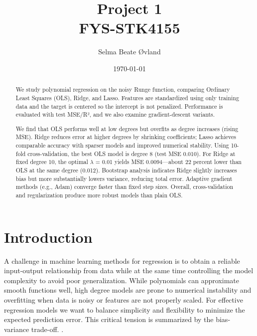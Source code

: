 \documentclass[amssymb,twocolumn,aps]{revtex4}
\begin{document}
	
\title{Project 1 \\
    \normalsize FYS-STK4155}
\date{\today}               
\author{Selma Beate Øvland}

\newpage
	
\begin{abstract}

We study polynomial regression on the noisy Runge function, comparing Ordinary Least Squares (OLS), Ridge, and Lasso. Features are standardized using only training data and the target is centered so the intercept is not penalized. Performance is evaluated with test MSE/R², and we also examine gradient-descent variants.

We find that OLS performs well at low degrees but overfits as degree increases (rising MSE). Ridge reduces error at higher degrees by shrinking coefficients; Lasso achieves comparable accuracy with sparser models and improved numerical stability. Using 10-fold cross-validation, the best OLS model is degree 8 (test MSE 0.010). For Ridge at fixed degree 10, the optimal $\lambda$ = 0.01 yields MSE 0.0094—about 22 percent lower than OLS at the same degree (0.012). Bootstrap analysis indicates Ridge slightly increases bias but more substantially lowers variance, reducing total error. Adaptive gradient methods (e.g., Adam) converge faster than fixed step sizes. Overall, cross-validation and regularization produce more robust models than plain OLS.

\end{abstract}


\maketitle

\section{Introduction}
A challenge in machine learning methods for regression is to obtain a reliable input-output relationship from data while at the same time controlling the model complexity to avoid poor generalization. While polynomials can approximate smooth functions well, high degree models are prone to numerical instability and overfitting when data is noisy or features are not properly scaled. For effective regression models we want to balance simplicity and flexibility to minimize the expected prediction error. This critical tension is summarized by the bias-variance trade-off. \cite{compfys39}. \\
\end{document}
